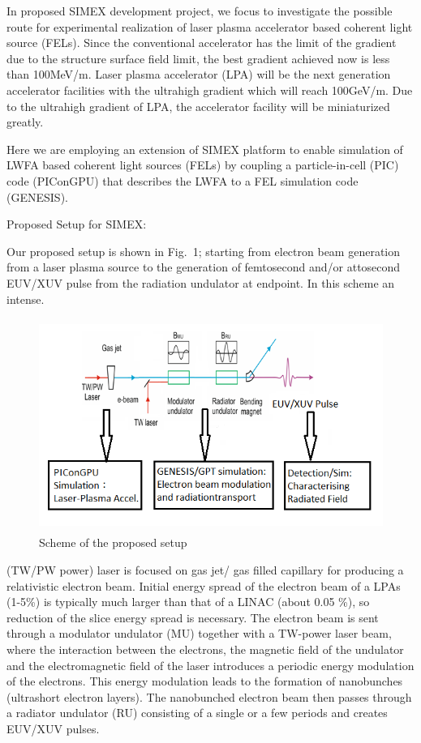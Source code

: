 In proposed SIMEX development project, we focus to investigate the possible
route for experimental realization of laser plasma accelerator based coherent
light source (FELs)\cite{Emma2004}. Since the conventional accelerator has the limit of the
gradient due to the structure surface field limit, the best gradient achieved
now is less than 100MeV/m. Laser plasma accelerator
(LPA)\cite{Leemans2006,Esarey2009,Tajima1979} will be the next
generation accelerator facilities with the ultrahigh gradient which will reach
100GeV/m. Due to the ultrahigh gradient of LPA, the accelerator facility will
be miniaturized greatly.

Here we are employing an extension of SIMEX platform to enable simulation of
LWFA based coherent light sources (FELs) by coupling a particle-in-cell (PIC)
code (PIConGPU)\cite{Bussmann2013} that describes the LWFA to a FEL simulation
code (GENESIS)\cite{genesis_online}.

Proposed Setup for SIMEX:

Our proposed setup is shown in Fig.~1; starting from electron beam generation
from a laser plasma source to the generation of femtosecond and/or attosecond
EUV/XUV pulse from the radiation undulator at endpoint. In this scheme an
intense.
%
\begin{figure}[ht]
  \includegraphics[width=5.4165in,height=2.7374in]{figures/lwfafel-img001.png}
  \caption{Scheme of the proposed setup}
  \label{lwfa-fig1}
\end{figure}
%
(TW/PW power) laser is focused on gas jet/ gas filled capillary for producing a
relativistic electron beam. Initial energy spread of the electron beam of a
LPAs (1-5\%) is typically much larger than that of a LINAC (about 0.05 \%), so
reduction of the slice energy spread is necessary. The electron beam is sent
through a modulator undulator (MU) together with a TW-power laser beam, where
the interaction between the electrons, the magnetic field of the undulator and
the electromagnetic field of the laser introduces a periodic energy modulation
of the electrons. This energy modulation leads to the formation of nanobunches
(ultrashort electron layers). The nanobunched electron beam then passes through
a radiator undulator (RU) consisting of a single or a few periods and creates
EUV/XUV pulses.


